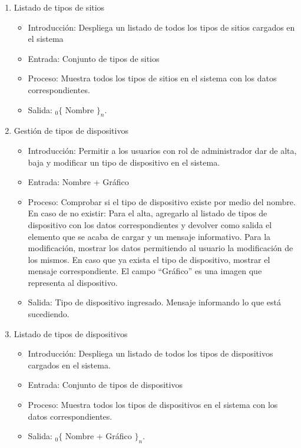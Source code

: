 \begin{enumerate}
			\item Listado de tipos de sitios
				\begin{itemize}
					\item Introducción: Despliega un listado de todos los tipos de sitios cargados en el sistema
					\item Entrada: Conjunto de tipos de sitios
					\item Proceso: Muestra todos los tipos de sitios en el sistema con los datos correspondientes.
					\item Salida: ${}_{0}\{$ Nombre $\}_n$.
				\end{itemize}
				
			\item Gestión de tipos de dispositivos
				\begin{itemize}
					\item Introducción: Permitir a los usuarios con rol de administrador dar de alta, baja y modificar un tipo de dispositivo en el sistema.
					\item Entrada: Nombre + Gráfico
					\item Proceso: Comprobar si el tipo de dispositivo existe por medio del nombre. En caso de no existir: 
					Para el alta, agregarlo al listado de tipos de dispositivo con los datos correspondientes y devolver como salida el elemento que se acaba de cargar y un mensaje informativo.
					Para la modificación, mostrar los datos permitiendo al usuario la modificación de los mismos.
					En caso que ya exista el tipo de dispositivo, mostrar el mensaje correspondiente.
					El campo ``Gráfico'' es una imagen que representa al dispositivo.
					\item Salida: Tipo de dispositivo ingresado. Mensaje informando lo que está sucediendo.
				\end{itemize}

			\item Listado de tipos de dispositivos
				\begin{itemize}
					\item Introducción: Despliega un listado de todos los tipos de dispositivos cargados en el sistema.
					\item Entrada: Conjunto de tipos de dispositivos
					\item Proceso: Muestra todos los tipos de dispositivos en el sistema con los datos correspondientes.
					\item Salida: ${}_{0}\{$ Nombre + Gráfico $\}_n$.
				\end{itemize}
				

\end{enumerate}
